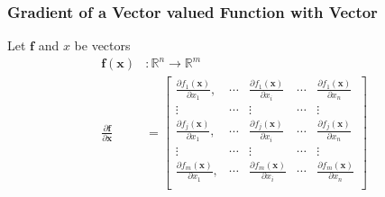 \documentclass[../../deep_learning_notes.tex]{subfiles}
\begin{document}
\subsubsection*{Gradient of a Vector valued Function with Vector}
Let $\bm{f}$ and $x$ be vectors
\begin{align*}
    \bm{f}(\bm{x})&: \mathbb{R}^{n} \rightarrow \mathbb{R}^{m}\\
    \frac{\partial \bm{f}}{\partial \bm{x}} &= \begin{bmatrix}
        \frac{\partial f_{1}(\bm{x})}{\partial x_{1}}, &\cdots &\frac{\partial f_{1}(\bm{x})}{\partial x_{i}} &\cdots &\frac{\partial f_{1}(\bm{x})}{\partial x_{n}}\\
        \vdots &\cdots &\vdots &\cdots &\vdots\\
        \frac{\partial f_{j}(\bm{x})}{\partial x_{1}}, &\cdots &\frac{\partial f_{j}(\bm{x})}{\partial x_{i}} &\cdots &\frac{\partial f_{j}(\bm{x})}{\partial x_{n}}\\
        \vdots &\cdots &\vdots &\cdots &\vdots\\
        \frac{\partial f_{m}(\bm{x})}{\partial x_{1}}, &\cdots &\frac{\partial f_{m}(\bm{x})}{\partial x_{i}} &\cdots &\frac{\partial f_{m}(\bm{x})}{\partial x_{n}}\\
    \end{bmatrix}\\
\end{align*}
\end{document}
